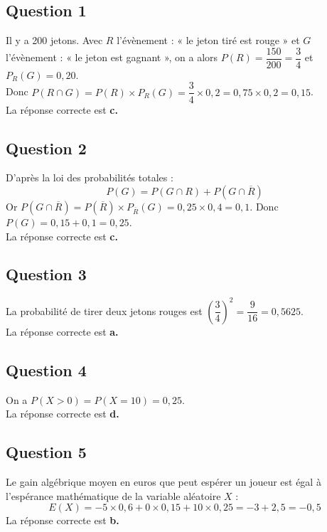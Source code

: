 \subsection*{Question 1}
Il y a 200 jetons. Avec $R$ l'évènement : « le jeton tiré est rouge » et $G$ l'évènement : « le jeton est gagnant », on a alors $P(R) = \dfrac{150}{200} = \dfrac{3}{4}$ et $P_R(G) = 0,20$.\\
Donc $P(R \cap G) = P(R) \times P_R(G) = \dfrac{3}{4} \times 0,2 = 0,75 \times 0,2 = 0,15$.\\ La réponse correcte est \textbf{c.}
	
	\subsection*{Question 2}
	
D'après la loi des probabilités totales :
	\[
	P(G) = P(G \cap R) + P(G \cap \overline{R})
	\]
Or $P(G \cap \overline{R}) = P(\overline{R}) \times P_{\overline{R}}(G) = 0,25 \times 0,4 = 0,1$. Donc $P(G) = 0,15 + 0,1 = 0,25$.\\ La réponse correcte est \textbf{c.}
	
	\subsection*{Question 3}
La probabilité de tirer deux jetons rouges est $\left(\dfrac{3}{4}\right)^2 = \dfrac{9}{16} = 0,5625$.\\ La réponse correcte est \textbf{a.}
	

\subsection*{Question 4}
	
On a $P(X > 0) = P(X = 10) = 0,25$.\\ La réponse correcte est \textbf{d.}
	
	\subsection*{Question 5}

Le gain algébrique moyen en euros que peut espérer un joueur est égal à l'espérance mathématique de la variable aléatoire $X$ :
	\[
	E(X) = -5 \times 0,6 + 0 \times 0,15 + 10 \times 0,25 = -3 + 2,5 = -0,5
	\]
La réponse correcte est \textbf{b.}
